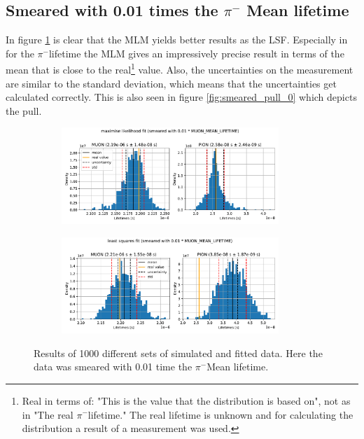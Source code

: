 \documentclass[11pt, a4paper, oneside]{book}
\newcommand\DoublePlotwidth{0.9}
\newcommand{\pion}{$\pi^{-}$}
\begin{document}
\subsection{Smeared with 0.01 times the \texorpdfstring{\pion}{pion} Mean lifetime}

In figure \ref{fig:results_smeared_0} is clear that the MLM yields better results as the LSF. Especially in for the \pion lifetime the MLM gives an impressively precise result in terms of the mean that is close to the real\footnote{Real in terms of: "This is the value that the distribution is based on", not as in "The real \pion lifetime." The real lifetime is unknown and for calculating the distribution a result of a measurement was used.} value. Also, the uncertainties on the measurement are similar to the standard deviation, which means that the uncertainties get calculated correctly. This is also seen in figure \ref{fig:smeared_pull_0} which depicts the pull.

\begin{figure}[h]
\begin{subfigure}{\textwidth}
  \centering
  \includegraphics[width=\DoublePlotwidth\textwidth]{images/4b_hist_0_likelihood.pdf}
\end{subfigure}

\begin{subfigure}{\textwidth}
  \centering
  \includegraphics[width=\DoublePlotwidth\textwidth]{images/4b_hist_0_squares.pdf}
\end{subfigure}
\caption{Results of 1000 different sets of simulated and fitted data. Here the data was smeared with 0.01 time the \pion Mean lifetime.}
\label{fig:results_smeared_0}
\end{figure}
\end{document}
